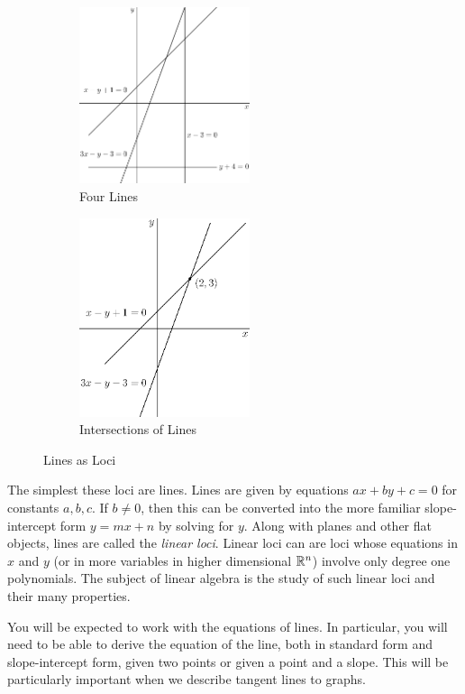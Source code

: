 \documentclass[fleqn]{report}
\begin{document}
\begin{figure}[t]
\centering
\begin{subfigure}{.5\textwidth}
 \centering
 \includegraphics[width=5cm]{figure02.eps}
 \caption{Four Lines}
 \label{Four  Lines}
\end{subfigure}%
\begin{subfigure}{.5\textwidth}
 \centering
 \includegraphics[width=5cm]{figure22.eps}
 \caption{Intersections of Lines}
 \label{Intersections of Lines}
\end{subfigure}
\caption{Lines as Loci}
\label{Lines as Loci}
\end{figure}

The simplest these loci are lines. Lines are given by
equations $ax + by + c = 0$ for constants $a,b,c$. If $b \neq
0$, then this can be converted into the more familiar
slope-intercept form $y = mx + n$ by solving for $y$. Along
with planes and other flat objects, lines are called the
\emph{linear loci}. Linear loci can are loci whose equations
in $x$ and $y$ (or in more variables in higher dimensional
$\mathbb{R}^n$) involve only degree one polynomials. The subject of
linear algebra is the study of such linear loci and their many
properties.

You will be expected to work with the equations of lines. In
particular, you will need to be able to derive the equation of
the line, both in standard form and slope-intercept form,
given two points or given a point and a slope. This will be
particularly important when we describe tangent lines to
graphs.
\end{document}
